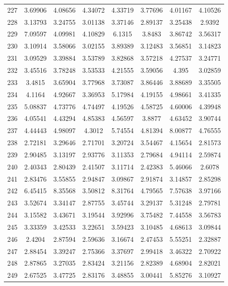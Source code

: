 \begin{center}
\begin{longtable}{cccccccc}
227 & 3.69906 & 4.08656 & 4.34072 & 4.33719 & 3.77696 & 4.01167 & 4.10526\\
228 & 3.13793 & 3.24755 & 3.01138 & 3.37146 & 2.89137 & 3.25438 & 2.9392\\
229 & 7.09597 & 4.09981 & 4.10829 & 6.1315 & 3.8483 & 3.86742 & 3.56317\\
230 & 3.10914 & 3.58066 & 3.02155 & 3.89389 & 3.12483 & 3.56851 & 3.14823\\
231 & 3.09529 & 3.39884 & 3.53789 & 3.82868 & 3.57218 & 4.27537 & 3.24771\\
232 & 3.45516 & 3.78248 & 3.53533 & 4.21555 & 3.59056 & 4.395 & 3.02859\\
233 & 3.4815 & 3.65904 & 3.77968 & 3.73087 & 3.86446 & 3.88689 & 3.35505\\
234 & 4.1164 & 4.92667 & 3.36953 & 5.17984 & 4.19155 & 4.98661 & 3.41335\\
235 & 5.08837 & 4.73776 & 4.74497 & 4.19526 & 4.58725 & 4.60006 & 4.39948\\
236 & 4.05541 & 4.43294 & 4.85383 & 4.56597 & 3.8877 & 4.63452 & 3.90744\\
237 & 4.44443 & 4.98097 & 4.3012 & 5.74554 & 4.81394 & 8.00877 & 4.76555\\
238 & 2.72181 & 3.29646 & 2.71701 & 3.20724 & 3.54467 & 4.15654 & 2.81573\\
239 & 2.90485 & 3.13197 & 2.93776 & 3.11353 & 2.79684 & 4.94114 & 2.59874\\
240 & 2.40343 & 2.80439 & 2.41507 & 3.11714 & 2.42383 & 5.46066 & 2.6078\\
241 & 2.83476 & 3.55855 & 2.94847 & 3.09867 & 2.91874 & 3.14857 & 2.85298\\
242 & 6.45415 & 8.35568 & 3.50812 & 8.31764 & 4.79565 & 7.57638 & 3.97166\\
243 & 3.52674 & 3.34147 & 2.87755 & 3.45744 & 3.29137 & 5.31248 & 2.79781\\
244 & 3.15582 & 3.43671 & 3.19544 & 3.92996 & 3.75482 & 7.44558 & 3.56783\\
245 & 3.33359 & 3.42533 & 3.22651 & 3.59423 & 3.10485 & 4.68613 & 3.09844\\
246 & 2.4204 & 2.87594 & 2.59636 & 3.16674 & 2.47453 & 5.55251 & 2.32887\\
247 & 2.88454 & 3.39247 & 2.75366 & 3.37697 & 2.99418 & 3.46322 & 2.70922\\
248 & 2.87865 & 3.27035 & 2.83424 & 3.21156 & 2.82389 & 4.68904 & 2.82021\\
249 & 2.67525 & 3.47725 & 2.83176 & 3.48855 & 3.00441 & 5.85276 & 3.10927\\

\end{longtable}
\end{center}
